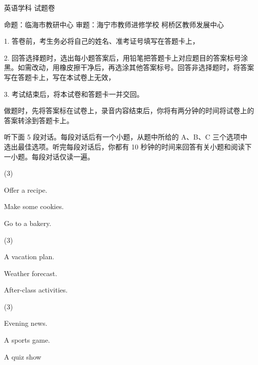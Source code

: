 \documentclass{英语试卷}
\begin{document}
\par 英语学科 试题卷\par
\par 命题：临海市教研中心 审题：海宁市教师进修学校 柯桥区教师发展中心\par
\begin{notice}
\par 1. 答卷前，考生务必将自己的姓名、准考证号填写在答题卡上，\par
\par 2. 回答选择题时，选出每小题答案后，用铅笔把答题卡上对应题目的答案标号涂黑。如需改动，用橡皮擦干净后，再选涂其他答案标号。回答非选择题时，将答案写在答题卡上，写在本试卷上无效，\par
\par 3. 考试结束后，将本试卷和答题卡一并交回。\par
\end{notice}
\par 做题时，先将答案标在试卷上，录音内容结束后，你将有两分钟的时间将试卷上的答案转涂到答题卡上。\par
{}
\par 听下面 5 段对话。每段对话后有一个小题，从题中所给的 A、B、C 三个选项中选出最佳选项。听完每段对话后，你都有 10 秒钟的时间来回答有关小题和阅读下一小题。每段对话仅读一遍。\par
{}
\begin{choices}(3)
  \item Offer a recipe.
  \item Make some cookies.
  \item Go to a bakery.
\end{choices}
\begin{choices}(3)
  \item A vacation plan.
  \item Weather forecast.
  \item After-class activities.
\end{choices}
\begin{choices}(3)
  \item Evening news.
  \item A sports game.
  \item A quiz show
\end{choices}
\end{document}
